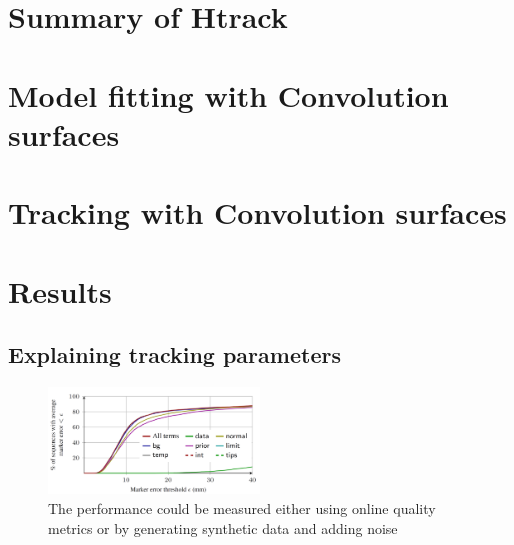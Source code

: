 \section{Summary of Htrack}
\section{Model fitting with Convolution surfaces}
\section{Tracking with Convolution surfaces}
\section{Results}

\subsection{Explaining tracking parameters}
\begin{figure}[h!] 
	\centering
	\includegraphics[width=0.5\textwidth]{fig/draft/draft_explaining_parameters}
	\caption{The performance could be measured either using online quality metrics or by generating synthetic data and adding noise}
	\label{fig:modeling}
\end{figure}

